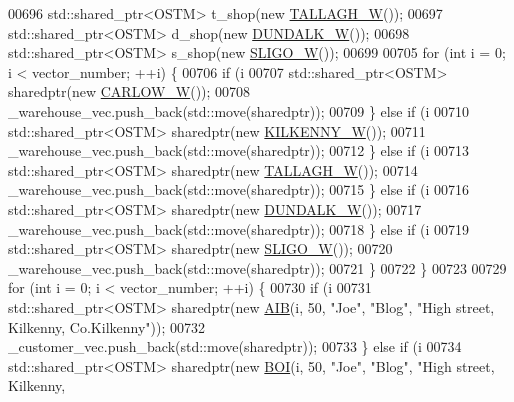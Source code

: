 \begin{DoxyCode}
00696     std::shared\_ptr<OSTM> t\_shop(\textcolor{keyword}{new} \hyperlink{class_t_a_l_l_a_g_h___w}{TALLAGH\_W}());
00697     std::shared\_ptr<OSTM> d\_shop(\textcolor{keyword}{new} \hyperlink{class_d_u_n_d_a_l_k___w}{DUNDALK\_W}());
00698     std::shared\_ptr<OSTM> s\_shop(\textcolor{keyword}{new} \hyperlink{class_s_l_i_g_o___w}{SLIGO\_W}());
00699 
00705     \textcolor{keywordflow}{for} (\textcolor{keywordtype}{int} i = 0; i < vector\_number; ++i) \{
00706         \textcolor{keywordflow}{if} (i %
00707             std::shared\_ptr<OSTM> sharedptr(\textcolor{keyword}{new} \hyperlink{class_c_a_r_l_o_w___w}{CARLOW\_W}());
00708             \_warehouse\_vec.push\_back(std::move(sharedptr));
00709         \} \textcolor{keywordflow}{else} \textcolor{keywordflow}{if} (i %
00710             std::shared\_ptr<OSTM> sharedptr(\textcolor{keyword}{new} \hyperlink{class_k_i_l_k_e_n_n_y___w}{KILKENNY\_W}());
00711             \_warehouse\_vec.push\_back(std::move(sharedptr));
00712         \} \textcolor{keywordflow}{else} \textcolor{keywordflow}{if} (i %
00713             std::shared\_ptr<OSTM> sharedptr(\textcolor{keyword}{new} \hyperlink{class_t_a_l_l_a_g_h___w}{TALLAGH\_W}());
00714             \_warehouse\_vec.push\_back(std::move(sharedptr));
00715         \} \textcolor{keywordflow}{else} \textcolor{keywordflow}{if} (i %
00716             std::shared\_ptr<OSTM> sharedptr(\textcolor{keyword}{new} \hyperlink{class_d_u_n_d_a_l_k___w}{DUNDALK\_W}());
00717             \_warehouse\_vec.push\_back(std::move(sharedptr));
00718         \} \textcolor{keywordflow}{else} \textcolor{keywordflow}{if} (i %
00719             std::shared\_ptr<OSTM> sharedptr(\textcolor{keyword}{new} \hyperlink{class_s_l_i_g_o___w}{SLIGO\_W}());
00720             \_warehouse\_vec.push\_back(std::move(sharedptr));
00721         \}
00722     \}
00723 
00729     \textcolor{keywordflow}{for} (\textcolor{keywordtype}{int} i = 0; i < vector\_number; ++i) \{
00730         \textcolor{keywordflow}{if} (i %
00731             std::shared\_ptr<OSTM> sharedptr(\textcolor{keyword}{new} \hyperlink{class_a_i_b}{AIB}(i, 50, \textcolor{stringliteral}{"Joe"}, \textcolor{stringliteral}{"Blog"}, \textcolor{stringliteral}{"High street, Kilkenny,
       Co.Kilkenny"}));
00732             \_customer\_vec.push\_back(std::move(sharedptr));
00733         \} \textcolor{keywordflow}{else} \textcolor{keywordflow}{if} (i %
00734             std::shared\_ptr<OSTM> sharedptr(\textcolor{keyword}{new} \hyperlink{class_b_o_i}{BOI}(i, 50, \textcolor{stringliteral}{"Joe"}, \textcolor{stringliteral}{"Blog"}, \textcolor{stringliteral}{"High street, Kilkenny,
}
\end{DoxyCode}
